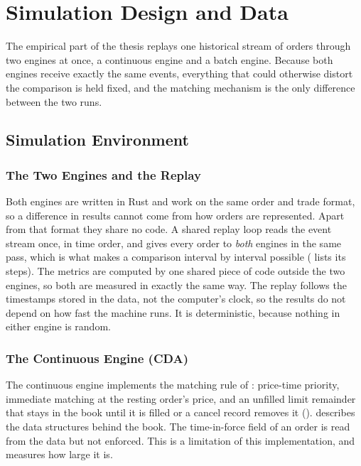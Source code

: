 \chapter{Simulation Design and Data}
\label{ch:simulation}

The empirical part of the thesis replays one historical stream of orders
through two engines at once, a continuous engine and a batch engine.
Because both engines receive exactly the same events, everything that could
otherwise distort the comparison is held fixed, and the matching mechanism is
the only difference between the two runs.

\section{Simulation Environment}
\label{sec:environment}

\subsection{The Two Engines and the Replay}

Both engines are written in Rust and work on the same order and trade format,
so a difference in results cannot come from how orders are represented.
Apart from that format they share no code. A shared replay loop reads the
event stream once, in time order, and gives every order to \emph{both}
engines in the same pass, which is what makes a comparison interval by
interval possible ( lists its steps). The metrics are computed by one shared piece of
code outside the two engines, so both are measured in exactly the same way.
The replay follows the timestamps stored in the data, not the computer's
clock, so the results do not depend on how fast the machine runs. It is
deterministic, because nothing in either engine is random.

\subsection{The Continuous Engine (CDA)}

The continuous engine implements the matching rule of :
price-time priority, immediate matching at the resting order's price, and an
unfilled limit remainder that stays in the book until it is filled or a cancel
record removes it ().  describes the
data structures behind the book. The
time-in-force field of an order is read from the data but not enforced.
This is a limitation of this implementation, and 
measures how large it is.

